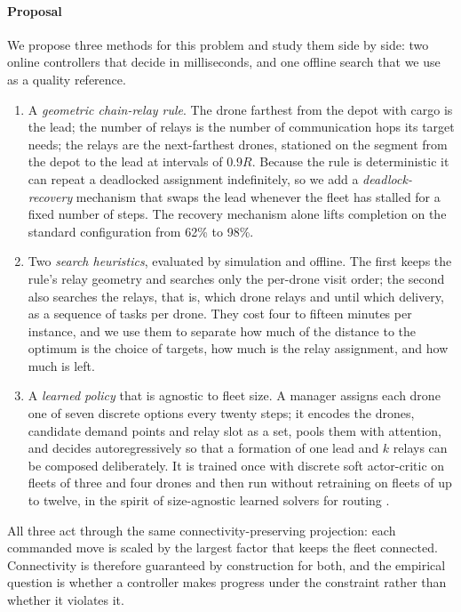 \documentclass[final,5p,times,twocolumn]{elsarticle}
\begin{document}
\paragraph{Proposal}
We propose three methods for this problem and study them side by side: two online controllers
that decide in milliseconds, and one offline search that we use as a quality reference.
\begin{enumerate}
\item A \emph{geometric chain-relay rule}. The drone farthest from the depot with cargo is
the lead; the number of relays is the number of communication hops its target needs; the relays
are the next-farthest drones, stationed on the segment from the depot to the lead at intervals of
$0.9R$. Because the rule is deterministic it can repeat a deadlocked assignment indefinitely, so
we add a \emph{deadlock-recovery} mechanism that swaps the lead whenever the fleet has stalled for a
fixed number of steps. The recovery mechanism alone lifts completion on the standard configuration
from 62\% to 98\%.
\item Two \emph{search heuristics}, evaluated by simulation and offline. The first keeps the
rule's relay geometry and searches only the per-drone visit order; the second also searches the
relays, that is, which drone relays and until which delivery, as a sequence of tasks per drone.
They cost four to fifteen minutes per instance, and we use them to separate how much of the distance to
the optimum is the choice of targets, how much is the relay assignment, and how much is left.
\item A \emph{learned policy} that is agnostic to fleet size. A manager assigns each drone one of
seven discrete options every twenty steps; it encodes the drones, candidate demand points and relay
slot as a set, pools them with attention, and decides autoregressively so that a formation of one
lead and $k$ relays can be composed deliberately. It is trained once with discrete soft
actor-critic \cite{haarnoja2018} on fleets of three and four drones and then run without
retraining on fleets of up to twelve, in the spirit of size-agnostic learned solvers for routing
\cite{kool2019,park2023}.
\end{enumerate}
All three act through the same connectivity-preserving projection: each commanded move is
scaled by the largest factor that keeps the fleet connected. Connectivity is therefore guaranteed
by construction for both, and the empirical question is whether a controller makes progress under
the constraint rather than whether it violates it.
\end{document}
